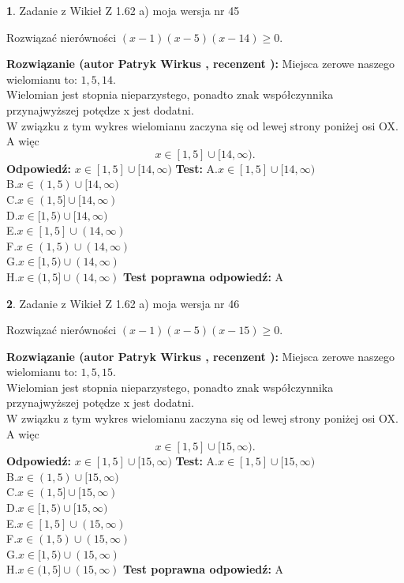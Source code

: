 \documentclass[12pt, a4paper]{article}
\theoremstyle{definition} %
\newtheorem{zad}{}
\newcommand{\zadStart}[1]{\begin{zad}#1\newline}
\newcommand{\zadStop}{\end{zad}}
\newcommand{\rozwStart}[2]{\noindent \textbf{Rozwiązanie (autor #1 , recenzent #2): }\newline}
\newcommand{\rozwStop}{\newline}
\newcommand{\odpStart}{\noindent \textbf{Odpowiedź:}\newline}
\newcommand{\odpStop}{\newline}
\newcommand{\testStart}{\noindent \textbf{Test:}\newline}
\newcommand{\testStop}{\newline}
\newcommand{\kluczStart}{\noindent \textbf{Test poprawna odpowiedź:}\newline}
\newcommand{\kluczStop}{\newline}
\begin{document}
\zadStart{Zadanie z Wikieł Z 1.62 a) moja wersja nr 45}

Rozwiązać nierówności $(x-1)(x-5)(x-14)\ge0$.
\zadStop
\rozwStart{Patryk Wirkus}{}
Miejsca zerowe naszego wielomianu to: $1, 5, 14$.\\
Wielomian jest stopnia nieparzystego, ponadto znak współczynnika przy\linebreak najwyższej potędze x jest dodatni.\\ W związku z tym wykres wielomianu zaczyna się od lewej strony poniżej osi OX. A więc $$x \in [1,5] \cup [14,\infty).$$
\rozwStop
\odpStart
$x \in [1,5] \cup [14,\infty)$
\odpStop
\testStart
A.$x \in [1,5] \cup [14,\infty)$\\
B.$x \in (1,5) \cup [14,\infty)$\\
C.$x \in (1,5] \cup [14,\infty)$\\
D.$x \in [1,5) \cup [14,\infty)$\\
E.$x \in [1,5] \cup (14,\infty)$\\
F.$x \in (1,5) \cup (14,\infty)$\\
G.$x \in [1,5) \cup (14,\infty)$\\
H.$x \in (1,5] \cup (14,\infty)$
\testStop
\kluczStart
A
\kluczStop



\zadStart{Zadanie z Wikieł Z 1.62 a) moja wersja nr 46}

Rozwiązać nierówności $(x-1)(x-5)(x-15)\ge0$.
\zadStop
\rozwStart{Patryk Wirkus}{}
Miejsca zerowe naszego wielomianu to: $1, 5, 15$.\\
Wielomian jest stopnia nieparzystego, ponadto znak współczynnika przy\linebreak najwyższej potędze x jest dodatni.\\ W związku z tym wykres wielomianu zaczyna się od lewej strony poniżej osi OX. A więc $$x \in [1,5] \cup [15,\infty).$$
\rozwStop
\odpStart
$x \in [1,5] \cup [15,\infty)$
\odpStop
\testStart
A.$x \in [1,5] \cup [15,\infty)$\\
B.$x \in (1,5) \cup [15,\infty)$\\
C.$x \in (1,5] \cup [15,\infty)$\\
D.$x \in [1,5) \cup [15,\infty)$\\
E.$x \in [1,5] \cup (15,\infty)$\\
F.$x \in (1,5) \cup (15,\infty)$\\
G.$x \in [1,5) \cup (15,\infty)$\\
H.$x \in (1,5] \cup (15,\infty)$
\testStop
\kluczStart
A
\kluczStop
\end{document}
